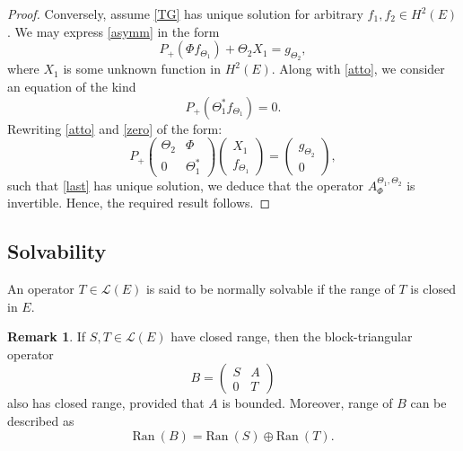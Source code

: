 \documentclass{amsart}
\theoremstyle{definition}
\newtheorem{rem}[thm]{Remark}
\newcommand{\oL }{\mathcal{L}(E) }
\def\ni{\noindent}
\begin{document}
\begin{proof}
Conversely, assume \eqref{TG} has unique solution for arbitrary $f_{1}, f_{2}\in H^{2}(E)$. We may express  \eqref{asymm} in the form
 \begin{equation}\label{atto}
 P_{+}(\Phi f_{\Theta_{1}})+\Theta_{2}X_{1}=g_{\Theta_{2}},
 \end{equation}
 where $X_{1}$ is some unknown function in %
  $H^{2}(E)$. Along with \eqref{atto}, we consider an equation of the kind
 \begin{equation}\label{zero}
 P_{+}(\Theta_{1}^{*}f_{\Theta_{1}})=0.
 \end{equation}
 Rewriting \eqref{atto} and \eqref{zero} of the form:
 \begin{equation}\label{last}
P_{+}\begin{pmatrix}
\Theta_{2}& \Phi\\
0&\Theta_{1}^{*}
\end{pmatrix}
\begin{pmatrix}
X_{1}\\
f_{\Theta_{1}}
\end{pmatrix}
=\begin{pmatrix}
g_{\Theta_{2}}\\
0
\end{pmatrix},
\end{equation}
such that \eqref{last} has unique solution, we deduce that the operator $A_{\Phi}^{\Theta_{1},\Theta_{2}}$ is invertible. Hence, the required result follows.
\end{proof}
\subsection{Solvability}
     An operator $T\in \mathcal{L}(E)$ is said to be normally solvable if the range of $T$ is closed in $E$.
\medskip


    \begin{rem}\label{Blockrange}
    If $S, T\in \oL$ have closed range, then the block-triangular operator 
$$B=\begin{pmatrix}
    S&A\\
    0&T
\end{pmatrix}$$ also has closed range, provided that $A$ is bounded.
Moreover, range of 
$B$ can be described as
$$\text{Ran}~ (B)=\text{Ran}~(S)\oplus \text{Ran}~(T).$$
\end{rem}
\end{document}
